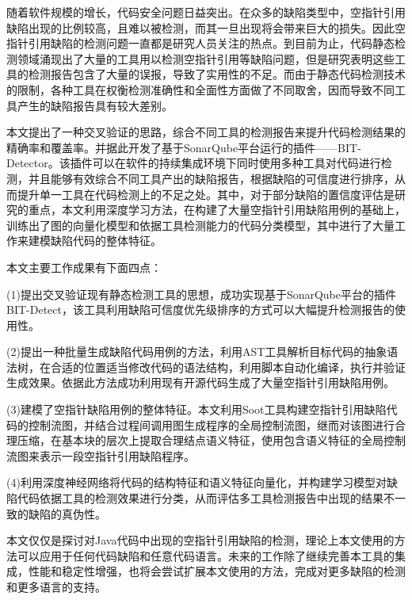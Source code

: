 

\begin{conclusion}

随着软件规模的增长，代码安全问题日益突出。在众多的缺陷类型中，空指针引用缺陷出现的比例较高，且难以被检测，而其一旦出现将会带来巨大的损失。因此空指针引用缺陷的检测问题一直都是研究人员关注的热点。到目前为止，代码静态检测领域涌现出了大量的工具用以检测空指针引用等缺陷问题，但是研究表明这些工具的检测报告包含了大量的误报，导致了实用性的不足。而由于静态代码检测技术的限制，各种工具在权衡检测准确性和全面性方面做了不同取舍，因而导致不同工具产生的缺陷报告具有较大差别。

本文提出了一种交叉验证的思路，综合不同工具的检测报告来提升代码检测结果的精确率和覆盖率。并据此开发了基于SonarQube平台运行的插件——BIT-Detector。该插件可以在软件的持续集成环境下同时使用多种工具对代码进行检测，并且能够有效综合不同工具产出的缺陷报告，根据缺陷的可信度进行排序，从而提升单一工具在代码检测上的不足之处。其中，对于部分缺陷的置信度评估是研究的重点，本文利用深度学习方法，在构建了大量空指针引用缺陷用例的基础上，训练出了图的向量化模型和依据工具检测能力的代码分类模型，其中进行了大量工作来建模缺陷代码的整体特征。

本文主要工作成果有下面四点：

(1)提出交叉验证现有静态检测工具的思想，成功实现基于SonarQube平台的插件BIT-Detect，该工具利用缺陷可信度优先级排序的方式可以大幅提升检测报告的使用性。

(2)提出一种批量生成缺陷代码用例的方法，利用AST工具解析目标代码的抽象语法树，在合适的位置适当修改代码的语法结构，利用脚本自动化编译，执行并验证生成效果。依据此方法成功利用现有开源代码生成了大量空指针引用缺陷用例。

(3)建模了空指针缺陷用例的整体特征。本文利用Soot工具构建空指针引用缺陷代码的控制流图，并结合过程间调用图生成程序的全局控制流图，继而对该图进行合理压缩，在基本块的层次上提取合理结点语义特征，使用包含语义特征的全局控制流图来表示一段空指针引用缺陷程序。

(4)利用深度神经网络将代码的结构特征和语义特征向量化，并构建学习模型对缺陷代码依据工具的检测效果进行分类，从而评估多工具检测报告中出现的结果不一致的缺陷的真伪性。

本文仅仅是探讨对Java代码中出现的空指针引用缺陷的检测，理论上本文使用的方法可以应用于任何代码缺陷和任意代码语言。未来的工作除了继续完善本工具的集成，性能和稳定性增强，也将会尝试扩展本文使用的方法，完成对更多缺陷的检测和更多语言的支持。

\end{conclusion}